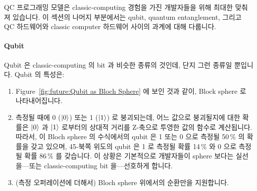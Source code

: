 QC 프로그래밍 모델은 classic-computing 경험을 가진 개발자들을 위해 최대한
맞춰져 있습니다.
이 섹션의 나머지 부분에서는 qubit, quantum entanglement, 그리고 QC 하드웨어와
classic computer 하드웨어 사이의 과계에 대해 다룹니다.

\paragraph{Qubit}

Qubit 은 classic-computing 의 bit 과 비슷한 종류의 것인데, 단지 그런 종류일
뿐입니다.
Qubit 의 특성은:

\begin{enumerate}
\item	Figure~\ref{fig:future:Qubit as Bloch Sphere} 에 보인 것과 같이, Block
	sphere 로 나타내어집니다.
\item	측정될 때에 0 ($\ket{0}$) 또는 1 ($\ket{1}$) 로 붕괴되는데, 어느 값으로
	붕괴될지에 대한 확률은 $\ket{0}$ 과 $\ket{1}$ 로부터의 상대적 거리를
	Z-축으로 투영한 값의 함수로 계산됩니다.
	따라서, 이 Bloch sphere 의 수식에서의 qubit 은 1 또는 0 으로 측정될
	50\,\% 의 확률을 갖고 있으며, 45\textdegree-북쪽 위도의 qubit 은 1 로
	측정될 확률 14\,\% 와 0 으로 측정될 확률 86\,\% 를 갖습니다.
	이 상황은 기본적으로 개발자들이 sphere 보다는 실선을---또는
	classic-computing bit 을---선호하게 합니다.
\item	(측정 오퍼레이션에 더해서) Bloch sphere 위에서의 순환만을 지원합니다.

\end{enumerate}

